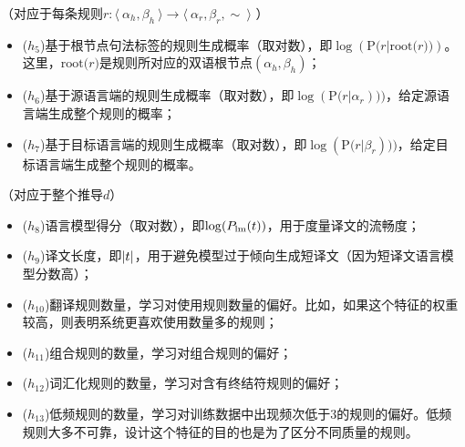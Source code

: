 \vspace{0.5em}
（对应于每条规则$r : \langle\  \alpha_h, \beta_h\ \rangle \to \langle\ \alpha_r, \beta_r, \sim\ \rangle$ ）

\begin{itemize}
\vspace{0.5em}
\item ($h_{5}$)基于根节点句法标签的规则生成概率（取对数），即$\log(\textrm{P(}r|\textrm{root(}r\textrm{))})$。这里，$\textrm{root(}r)$是规则所对应的双语根节点$(\alpha_h,\beta_h)$；
\vspace{0.5em}
\item ($h_{6}$)基于源语言端的规则生成概率（取对数），即$\log(\textrm{P(}r|\alpha_r)))$，给定源语言端生成整个规则的概率；
\vspace{0.5em}
\item ($h_{7}$)基于目标语言端的规则生成概率（取对数），即$\log(\textrm{P(}r|\beta_r)))$，给定目标语言端生成整个规则的概率。
\end{itemize}

\vspace{0.5em}
（对应于整个推导$d$）

\begin{itemize}
\vspace{0.5em}
\item ($h_{8}$)语言模型得分（取对数），即$\log({P}_{\textrm{lm}}({t}))$，用于度量译文的流畅度；
\vspace{0.5em}
\item ($h_{9}$)译文长度，即$|{t}|$，用于避免模型过于倾向生成短译文（因为短译文语言模型分数高）；
\vspace{0.5em}
\item ($h_{10}$)翻译规则数量，学习对使用规则数量的偏好。比如，如果这个特征的权重较高，则表明系统更喜欢使用数量多的规则；
\vspace{0.5em}
\item ($h_{11}$)组合规则的数量，学习对组合规则的偏好；
\vspace{0.5em}
\item ($h_{12}$)词汇化规则的数量，学习对含有终结符规则的偏好；
\vspace{0.5em}
\item ($h_{13}$)低频规则的数量，学习对训练数据中出现频次低于3的规则的偏好。低频规则大多不可靠，设计这个特征的目的也是为了区分不同质量的规则。
\end{itemize}

\vspace{0.5em}

